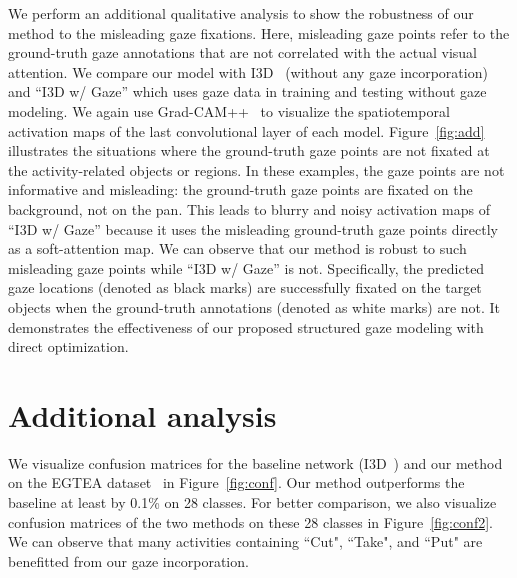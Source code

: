 \documentclass[10pt,twocolumn,letterpaper]{article}
\begin{document}
We perform an additional qualitative analysis to show the robustness of our method to the misleading gaze fixations. Here, misleading gaze points refer to the ground-truth gaze annotations that are not correlated with the actual visual attention. We compare our model with I3D~\cite{carreira2017quo} (without any gaze incorporation) and ``I3D w/ Gaze'' which uses gaze data in training and testing without gaze modeling. We again use Grad-CAM++~\cite{chattopadhay2018grad} to visualize the spatiotemporal activation maps of the last convolutional layer of each model. Figure~\ref{fig:add} illustrates the situations where the ground-truth gaze points are not fixated at the activity-related objects or regions. In these examples, the gaze points are not informative and misleading: the ground-truth gaze points are fixated on the background, not on the pan. This leads to blurry and noisy activation maps of ``I3D w/ Gaze'' because it uses the misleading ground-truth gaze points directly as a soft-attention map. We can observe that our method is robust to such misleading gaze points while ``I3D w/ Gaze'' is not. Specifically, the predicted gaze locations (denoted as black marks) are successfully fixated on the target objects when the ground-truth annotations (denoted as white marks) are not. It demonstrates the effectiveness of our proposed structured gaze modeling with direct optimization.

\section{Additional analysis}
We visualize confusion matrices for the baseline network (I3D~\cite{carreira2017quo}) and our method on the EGTEA dataset~\cite{li2018eye} in Figure~\ref{fig:conf}. Our method outperforms the baseline at least by 0.1\% on 28 classes. For better comparison, we also visualize confusion matrices of the two methods on these 28 classes in Figure~\ref{fig:conf2}. We can observe that many activities containing ``Cut", ``Take", and ``Put" are benefitted from our gaze incorporation.

\begin{figure*}[htbp]
\centering
\hspace{-6pt}
  \adjustbox{valign=t}{\begin{minipage}[t]{0.45\linewidth}
  \small
    \texttt{[image: cropped\_baseline.png]}\-0.5ex] \hspace*{12.7em}(b) Ours
  \end{minipage}}
  \caption{Confusion matrices for the baseline (I3D~\cite{carreira2017quo}) and ours on the EGTEA dataset~\cite{li2018eye}.}
  \label{fig:conf}
\end{figure*}
\end{document}
